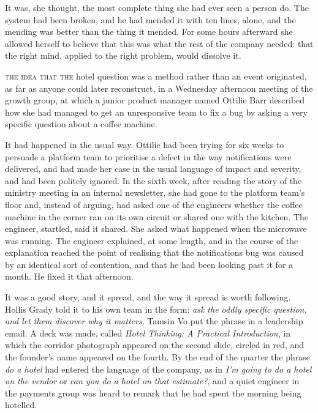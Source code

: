 It was, she thought, the most complete thing she had ever seen a person do. The system had been broken, and he had mended it with ten lines, alone, and the mending was better than the thing it mended. For some hours afterward she allowed herself to believe that this was what the rest of the company needed: that the right mind, applied to the right problem, would dissolve it.


\textsc{the idea that the} hotel question was a method rather than an event originated, as far as anyone could later reconstruct, in a Wednesday afternoon meeting of the growth group, at which a junior product manager named Ottilie Barr described how she had managed to get an unresponsive team to fix a bug by asking a very specific question about a coffee machine.

It had happened in the usual way. Ottilie had been trying for six weeks to persuade a platform team to prioritise a defect in the way notifications were delivered, and had made her case in the usual language of impact and severity, and had been politely ignored. In the sixth week, after reading the story of the ministry meeting in an internal newsletter, she had gone to the platform team's floor and, instead of arguing, had asked one of the engineers whether the coffee machine in the corner ran on its own circuit or shared one with the kitchen. The engineer, startled, said it shared. She asked what happened when the microwave was running. The engineer explained, at some length, and in the course of the explanation reached the point of realising that the notifications bug was caused by an identical sort of contention, and that he had been looking past it for a month. He fixed it that afternoon.

It was a good story, and it spread, and the way it spread is worth following. Hollis Grady told it to his own team in the form: \emph{ask the oddly specific question, and let them discover why it matters}. Tamsin Vo put the phrase in a leadership email. A deck was made, called \emph{Hotel Thinking: A Practical Introduction}, in which the corridor photograph appeared on the second slide, circled in red, and the founder's name appeared on the fourth. By the end of the quarter the phrase \emph{do a hotel} had entered the language of the company, as in \emph{I'm going to do a hotel on the vendor} or \emph{can you do a hotel on that estimate?}, and a quiet engineer in the payments group was heard to remark that he had spent the morning being hotelled.

